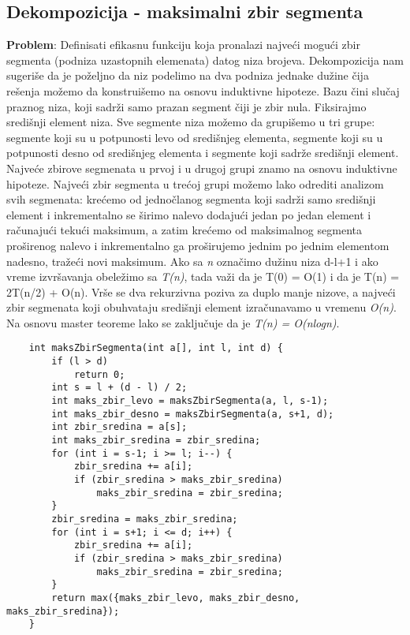 \documentclass{article}
\begin{document}
\subsection{Dekompozicija - maksimalni zbir segmenta}
\textbf{Problem}: Definisati efikasnu funkciju koja pronalazi najveći mogući zbir segmenta (podniza uzastopnih elemenata) datog niza brojeva. \newline
Dekompozicija nam sugeriše da je poželjno da niz podelimo na dva podniza
jednake dužine čija rešenja možemo da konstruišemo na osnovu induktivne
hipoteze. Bazu čini slučaj praznog
niza, koji sadrži samo prazan segment čiji je zbir nula. Fiksirajmo središnji
element niza. Sve segmente niza možemo da grupišemo u tri grupe: segmente
koji su u potpunosti levo od središnjeg elementa, segmente koji su u potpunosti
desno od središnjeg elementa i segmente koji sadrže središnji element. Najveće
zbirove segmenata u prvoj i u drugoj grupi znamo na osnovu induktivne hipoteze.
Najveći zbir segmenta u trećoj grupi možemo lako odrediti analizom svih segmenata: krećemo od jednočlanog segmenta koji sadrži samo središnji element
i inkrementalno se širimo nalevo dodajući jedan po jedan element i računajući
tekući maksimum, a zatim krećemo od maksimalnog segmenta proširenog nalevo
i inkrementalno ga proširujemo jednim po jednim elementom nadesno, tražeći
novi maksimum.
\newline
Ako sa \textit{n} označimo
dužinu niza d-l+1 i ako vreme izvršavanja obeležimo sa \textit{T(n)}, tada važi da
je T(0) = O(1) i da je T(n) = 2T(n/2) + O(n). Vrše se dva rekurzivna
poziva za duplo manje nizove, a najveći zbir segmenata koji obuhvataju središnji
element izračunavamo u vremenu \textit{O(n)}. Na
osnovu master teoreme lako se zaključuje da je \textit{T(n) = O(nlogn)}.
\newpage
\begin{lstlisting}
    int maksZbirSegmenta(int a[], int l, int d) {
        if (l > d)
            return 0;
        int s = l + (d - l) / 2;
        int maks_zbir_levo = maksZbirSegmenta(a, l, s-1);
        int maks_zbir_desno = maksZbirSegmenta(a, s+1, d);
        int zbir_sredina = a[s];
        int maks_zbir_sredina = zbir_sredina;
        for (int i = s-1; i >= l; i--) {
            zbir_sredina += a[i];
            if (zbir_sredina > maks_zbir_sredina)
                maks_zbir_sredina = zbir_sredina;
        }
        zbir_sredina = maks_zbir_sredina;
        for (int i = s+1; i <= d; i++) {
            zbir_sredina += a[i];
            if (zbir_sredina > maks_zbir_sredina)
                maks_zbir_sredina = zbir_sredina;
        }
        return max({maks_zbir_levo, maks_zbir_desno, maks_zbir_sredina});
    }
\end{lstlisting}
\end{document}
